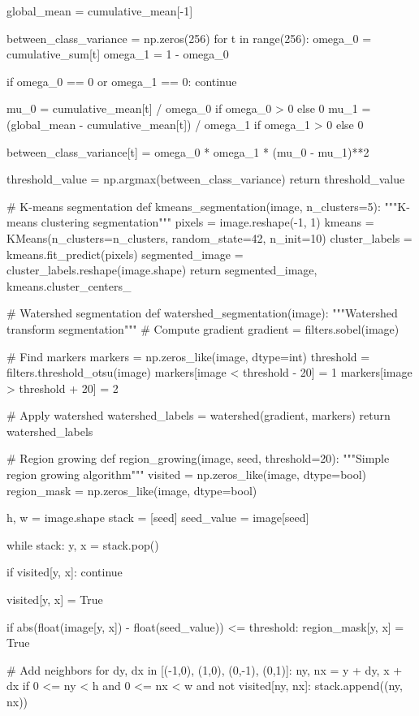 \documentclass[a4paper, 11pt]{article}
\begin{document}
\begin{pycode}
    global_mean = cumulative_mean[-1]

    between_class_variance = np.zeros(256)
    for t in range(256):
        omega_0 = cumulative_sum[t]
        omega_1 = 1 - omega_0

        if omega_0 == 0 or omega_1 == 0:
            continue

        mu_0 = cumulative_mean[t] / omega_0 if omega_0 > 0 else 0
        mu_1 = (global_mean - cumulative_mean[t]) / omega_1 if omega_1 > 0 else 0

        between_class_variance[t] = omega_0 * omega_1 * (mu_0 - mu_1)**2

    threshold_value = np.argmax(between_class_variance)
    return threshold_value

# K-means segmentation
def kmeans_segmentation(image, n_clusters=5):
    """K-means clustering segmentation"""
    pixels = image.reshape(-1, 1)
    kmeans = KMeans(n_clusters=n_clusters, random_state=42, n_init=10)
    cluster_labels = kmeans.fit_predict(pixels)
    segmented_image = cluster_labels.reshape(image.shape)
    return segmented_image, kmeans.cluster_centers_

# Watershed segmentation
def watershed_segmentation(image):
    """Watershed transform segmentation"""
    # Compute gradient
    gradient = filters.sobel(image)

    # Find markers
    markers = np.zeros_like(image, dtype=int)
    threshold = filters.threshold_otsu(image)
    markers[image < threshold - 20] = 1
    markers[image > threshold + 20] = 2

    # Apply watershed
    watershed_labels = watershed(gradient, markers)
    return watershed_labels

# Region growing
def region_growing(image, seed, threshold=20):
    """Simple region growing algorithm"""
    visited = np.zeros_like(image, dtype=bool)
    region_mask = np.zeros_like(image, dtype=bool)

    h, w = image.shape
    stack = [seed]
    seed_value = image[seed]

    while stack:
        y, x = stack.pop()

        if visited[y, x]:
            continue

        visited[y, x] = True

        if abs(float(image[y, x]) - float(seed_value)) <= threshold:
            region_mask[y, x] = True

            # Add neighbors
            for dy, dx in [(-1,0), (1,0), (0,-1), (0,1)]:
                ny, nx = y + dy, x + dx
                if 0 <= ny < h and 0 <= nx < w and not visited[ny, nx]:
                    stack.append((ny, nx))


\end{pycode}
\end{document}
